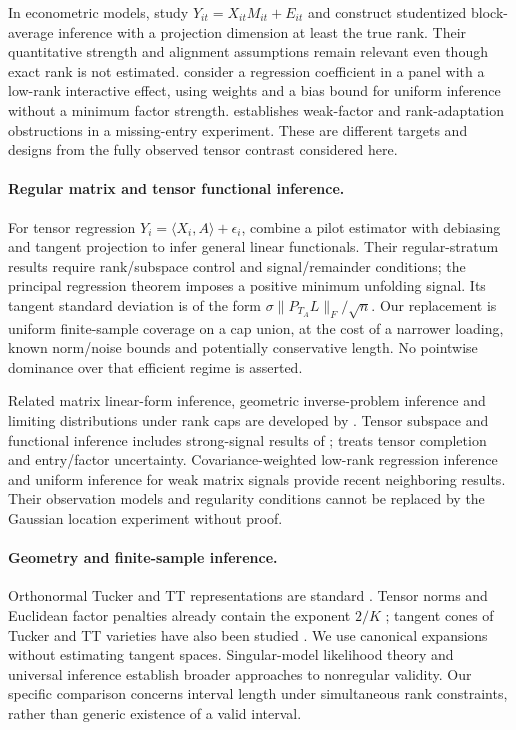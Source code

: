 \documentclass[11pt]{article}
\theoremstyle{remark}
\newcommand{\ip}[2]{\langle #1,#2\rangle}
\newcommand{\norm}[1]{\lVert #1\rVert}
\begin{document}
In econometric models, \citet{choi2026} study $Y_{it}=X_{it}M_{it}+E_{it}$ and construct studentized block-average inference with a projection dimension at least the true rank. Their quantitative strength and alignment assumptions remain relevant even though exact rank is not estimated. \citet{armstrong2026} consider a regression coefficient in a panel with a low-rank interactive effect, using weights and a bias bound for uniform inference without a minimum factor strength. \citet{zhu2019} establishes weak-factor and rank-adaptation obstructions in a missing-entry experiment. These are different targets and designs from the fully observed tensor contrast considered here.

\paragraph{Regular matrix and tensor functional inference.}
For tensor regression $Y_i=\ip{X_i}A+\epsilon_i$, \citet{xu2025} combine a pilot estimator with debiasing and tangent projection to infer general linear functionals. Their regular-stratum results require rank/subspace control and signal/remainder conditions; the principal regression theorem imposes a positive minimum unfolding signal. Its tangent standard deviation is of the form $\sigma\norm{P_{T_A}L}_F/\sqrt n$. Our replacement is uniform finite-sample coverage on a cap union, at the cost of a narrower loading, known norm/noise bounds and potentially conservative length. No pointwise dominance over that efficient regime is asserted.

Related matrix linear-form inference, geometric inverse-problem inference and limiting distributions under rank caps are developed by \citet{xiayuan2021,cailiangrakhlin2016,carpentierkim2018}. Tensor subspace and functional inference includes strong-signal results of \citet{xiazhangzhou2022,agterberg2024}; \citet{caipoorchen2023} treats tensor completion and entry/factor uncertainty. Covariance-weighted low-rank regression inference \citep{ke2026} and uniform inference for weak matrix signals \citep{bykhovskaya2025} provide recent neighboring results. Their observation models and regularity conditions cannot be replaced by the Gaussian location experiment without proof.

\paragraph{Geometry and finite-sample inference.}
Orthonormal Tucker and TT representations are standard \citep{delathauwer2000,oseledets2011}. Tensor norms and Euclidean factor penalties already contain the exponent $2/K$ \citep{friedlandlim2018,fan2023}; tangent cones of Tucker and TT varieties have also been studied \citep{gao2025,kutschan2018}. We use canonical expansions without estimating tangent spaces. Singular-model likelihood theory \citep{drton2009} and universal inference \citep{wasserman2020} establish broader approaches to nonregular validity. Our specific comparison concerns interval length under simultaneous rank constraints, rather than generic existence of a valid interval.
\end{document}
